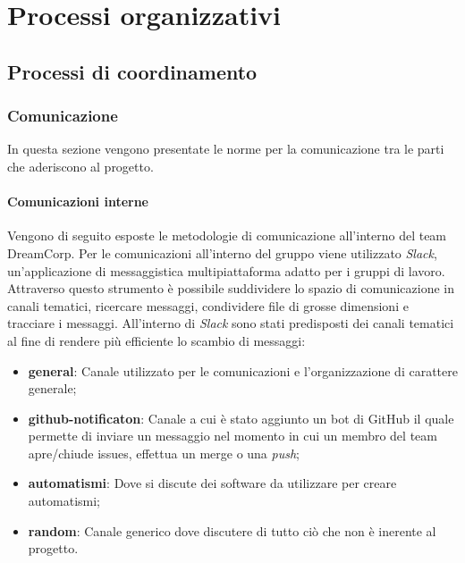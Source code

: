 \section{Processi organizzativi}
    \subsection{Processi di coordinamento}
        \subsubsection{Comunicazione}
            In questa sezione vengono presentate le norme per la comunicazione tra le parti che aderiscono al progetto.
            \paragraph{Comunicazioni interne}
                Vengono di seguito esposte le metodologie di comunicazione all'interno del team DreamCorp.
                \newline
                Per le comunicazioni all'interno del gruppo viene utilizzato \textit{Slack}\pedice, un'applicazione di messaggistica multipiattaforma adatto per i gruppi di lavoro. Attraverso questo strumento è possibile suddividere lo spazio di comunicazione in canali tematici, ricercare messaggi, condividere file di grosse dimensioni e tracciare i messaggi.
                \newline
                All'interno di \textit{Slack} sono stati predisposti dei canali tematici al fine di rendere più efficiente lo scambio di messaggi:
                \begin{itemize}
                    \item \textbf{general}: Canale utilizzato per le comunicazioni e l'organizzazione di carattere generale;
                    \item \textbf{github-notificaton}: Canale a cui è stato aggiunto un bot di GitHub il quale permette di inviare un messaggio nel momento in cui un membro del team apre/chiude issues, effettua un merge o una \textit{push};
                    \item \textbf{automatismi}: Dove si discute dei software da utilizzare per creare automatismi;
                    \item \textbf{random}: Canale generico dove discutere di tutto ciò che non è inerente al progetto.    
                \end{itemize}
                
